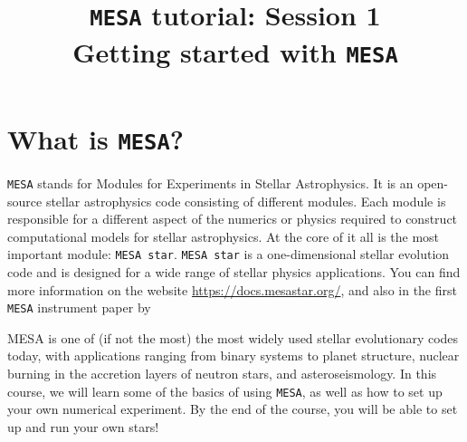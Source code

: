 \documentclass[11pt,a4paper]{article}
\begin{document}
\title{
    \textbf{\texttt{MESA} tutorial: Session 1} \\
    \textbf{\Large Getting started with \texttt{MESA}}
}
\date{}
\maketitle
\vspace{-2cm}


\section{What is \texttt{MESA}?}

\texttt{MESA} stands for Modules for Experiments in Stellar Astrophysics. It is an open-source stellar astrophysics code consisting of different modules. Each module is responsible for a different aspect of the numerics or physics required to construct computational models for stellar astrophysics. At the core of it all is the most important module: \texttt{MESA star}. \texttt{MESA star} is a one-dimensional stellar evolution code and is designed for a wide range of stellar physics applications. You can find more information on the website \url{https://docs.mesastar.org/}, and also in the first \texttt{MESA} instrument paper by  \cite{Paxton2011} %

MESA is one of (if not the most) the most widely used stellar evolutionary codes today, with applications ranging from binary systems to planet structure, nuclear burning in the accretion layers of neutron stars, and asteroseismology. 
In this course, we will learn some of the basics of using \texttt{MESA}, as well as how to set up your own numerical experiment. By the end of the course, you will be able to set up and run your own stars! 
\end{document}
